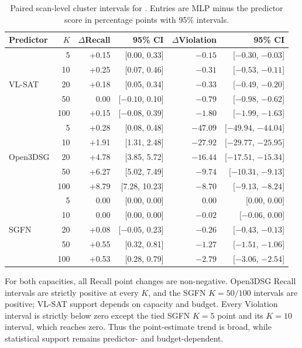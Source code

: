 \begin{table}[t]
\centering
{\small
\setlength{\tabcolsep}{5pt}
\begin{tabular}{lrrrrr}
\toprule
Predictor & $K$ & $\Delta$Recall & 95\% CI & $\Delta$Violation & 95\% CI \\
\midrule
\multirow{5}{*}{VL-SAT}
 & 5   & +0.15 & [0.00, 0.33] & $-0.15$ & [$-0.30$, $-0.03$] \\
 & 10  & +0.25 & [0.07, 0.46] & $-0.31$ & [$-0.53$, $-0.11$] \\
 & 20  & +0.18 & [0.05, 0.34] & $-0.33$ & [$-0.49$, $-0.20$] \\
 & 50  & 0.00 & [$-0.10$, 0.10] & $-0.79$ & [$-0.98$, $-0.62$] \\
 & 100 & +0.15 & [$-0.08$, 0.39] & $-1.80$ & [$-1.99$, $-1.63$] \\
\midrule
\multirow{5}{*}{Open3DSG}
 & 5   & +0.28 & [0.08, 0.48] & $-47.09$ & [$-49.94$, $-44.04$] \\
 & 10  & +1.91 & [1.31, 2.48] & $-27.92$ & [$-29.77$, $-25.95$] \\
 & 20  & +4.78 & [3.85, 5.72] & $-16.44$ & [$-17.51$, $-15.34$] \\
 & 50  & +6.27 & [5.02, 7.49] & $-9.74$ & [$-10.31$, $-9.13$] \\
 & 100 & +8.79 & [7.28, 10.23] & $-8.70$ & [$-9.13$, $-8.24$] \\
\midrule
\multirow{5}{*}{SGFN}
 & 5   & 0.00 & [0.00, 0.00] & 0.00 & [0.00, 0.00] \\
 & 10  & 0.00 & [0.00, 0.00] & $-0.02$ & [$-0.06$, 0.00] \\
 & 20  & +0.08 & [$-0.05$, 0.23] & $-0.26$ & [$-0.43$, $-0.13$] \\
 & 50  & +0.55 & [0.32, 0.81] & $-1.27$ & [$-1.51$, $-1.06$] \\
 & 100 & +0.53 & [0.28, 0.79] & $-2.79$ & [$-3.06$, $-2.54$] \\
\bottomrule
\end{tabular}
}
\caption{Paired scan-level cluster intervals for \methodmlp{}. Entries are
MLP minus the predictor score in percentage points with 95\% intervals.}
\label{tab:scan-cluster-mlp}
\end{table}

For both capacities, all Recall point changes are non-negative. Open3DSG Recall
intervals are strictly positive at every $K$, and the SGFN $K=50/100$
intervals are positive; VL-SAT support depends on capacity and budget. Every
Violation interval is strictly below zero except the tied SGFN $K=5$ point and
its $K=10$ interval, which reaches zero. Thus the point-estimate trend is broad,
while statistical support remains predictor- and budget-dependent.
